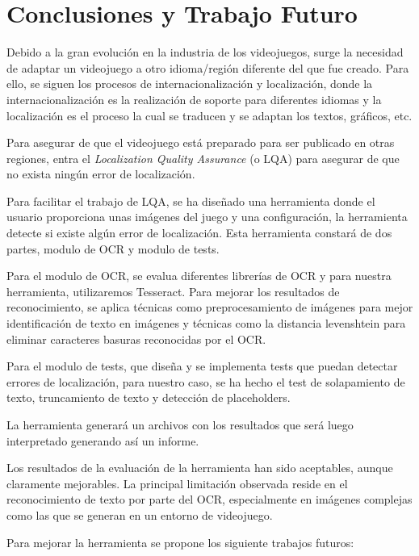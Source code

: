 \chapter{Conclusiones y Trabajo Futuro}
\label{cap:conclusiones}

Debido a la gran evolución en la industria de los videojuegos, surge la necesidad de adaptar un videojuego a otro idioma/región diferente del que fue creado. Para ello, se siguen los procesos de internacionalización y localización, donde la internacionalización es la realización de soporte para diferentes idiomas y la localización es el proceso la cual se traducen y se adaptan los textos, gráficos, etc.

Para asegurar de que el videojuego está preparado para ser publicado en otras regiones, entra el \textit{Localization Quality Assurance} (o LQA) para asegurar de que no exista ningún error de localización.

Para facilitar el trabajo de LQA, se ha diseñado una herramienta donde el usuario proporciona unas imágenes del juego y una configuración, la herramienta detecte si existe algún error de localización. Esta herramienta constará de dos partes, modulo de OCR y modulo de tests.

Para el modulo de OCR, se evalua diferentes librerías de OCR y para nuestra herramienta, utilizaremos Tesseract. Para mejorar los resultados de reconocimiento, se aplica técnicas como preprocesamiento de imágenes para mejor identificación de texto en imágenes y técnicas como la distancia levenshtein para eliminar caracteres basuras reconocidas por el OCR.

Para el modulo de tests, que diseña y se implementa tests que puedan detectar errores de localización, para nuestro caso, se ha hecho el test de solapamiento de texto, truncamiento de texto y detección de placeholders.

La herramienta generará un archivos con los resultados que será luego interpretado generando así un informe.

Los resultados de la evaluación de la herramienta han sido aceptables, aunque claramente mejorables. La principal limitación observada reside en el reconocimiento de texto por parte del OCR, especialmente en imágenes complejas como las que se generan en un entorno de videojuego.

Para mejorar la herramienta se propone los siguiente trabajos futuros:

